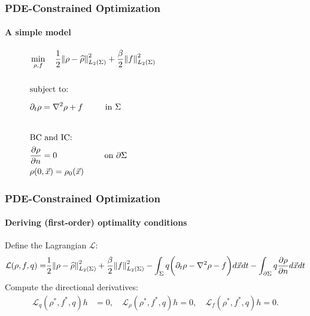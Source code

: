 \documentclass[aspectratio=169,xcolor=dvipsnames]{beamer}
\begin{document}
\begin{frame}
	\frametitle{PDE-Constrained Optimization}
	\framesubtitle{A simple model}
		\begin{align*}
		&\min_{\rho,f} \quad \frac{1}{2}\norm{\rho- \widehat{\rho}}_{L_2(\Sigma)}^2 + \frac{\beta}{2} \norm{f}_{L_2(\Sigma)}^2\\
		\\
		&\text{subject to:}
		\\
		& \partial_t \rho = \nabla^2 \rho + f \ \qquad \text{  in    } \Sigma \phantom{ \nabla \cdot (\rho \vec{w})+{\nabla \cdot \int_\Omega \rho(\vec{x}) \rho(\vec{x}') \nabla V_2(|\vec{x}-\vec{x}\hspace{0.2em}'|)d\vec{x}'} }\\
		\\
		&\text{BC } \text{and IC:}\\
		&\frac{\partial \rho}{\partial n}  = 0 \quad \ \ \qquad \qquad \text{on   } \partial \Sigma   \\
		&\rho(0,\vec{x}) = \rho_0(\vec{x})
		\end{align*}

\end{frame}

\begin{frame}
	\frametitle{PDE-Constrained Optimization}
		\framesubtitle{Deriving (first-order) optimality conditions}
	Define the Lagrangian $\mathcal{L}$:
	\begin{align*}
		\mathcal{L}(\rho, f,q)=& \frac{1}{2}\norm{\rho- \widehat{\rho}}_{L_2(\Sigma)}^2 + \frac{\beta}{2} \norm{f}_{L_2(\Sigma)}^2- \int_\Sigma q \bigg( \partial_t \rho - \nabla^2 \rho  - f \bigg) d\vec{x} dt - \int_{\partial \Sigma} q \frac{\partial \rho}{\partial n}   d\vec{x} dt\\
	\end{align*}
	Compute the directional derivatives:
	\begin{align*}
		\mathcal{L}_q (\rho^*, f^*,q) h&= 0, \quad
		\mathcal{L}_\rho (\rho^*, f^*,q) h= 0, \quad
		\mathcal{L}_f (\rho^*, f^*,q) h= 0.
	\end{align*}
\end{frame}
\end{document}
